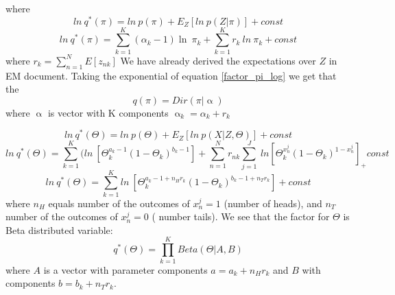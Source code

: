 \documentclass{article}
\newcommand\ProdK{\prod_{k=1}^{K}}
\newcommand\SumK{\sum_{k=1}^{K}}
\newcommand\SumN{\sum_{n=1}^{N}}
\newcommand\SumJ{\sum_{j=1}^{J}}
\begin{document}
where
\begin{equation}
    ln\:q^*(\pi) = ln\:p(\pi) + E_{Z}[ln\:p(Z|\pi)] + const
\end{equation}
\begin{equation}\label{factor_pi_log}
    ln\:q^*(\pi) = \SumK{(\alpha_k-1)\ln\:\pi_k} + \SumK r_k\:ln\:\pi_k+ const
\end{equation}
where $r_{k} = \SumN E[z_{nk}]$
We have already derived the expectations over $Z$ in EM document.
Taking the exponential of equation \ref{factor_pi_log} we get that the 
\begin{equation}
    q(\pi) = Dir(\pi| \upalpha)
\end{equation}
where $\upalpha$ is vector with K components $\upalpha_k = \alpha_k+r_k$

\begin{equation}
    ln\:q^*(\Theta) = ln\:p(\Theta) + E_Z[ln\:p(X|Z,\Theta)] + const
\end{equation}
\begin{equation}
    ln\:q^*(\Theta) = \SumK (ln\:[\Theta_k^{a_k-1}(1-\Theta_k)^{b_k-1}] + \SumN r_{nk}\SumJ \:ln[\Theta_k^{x_n^j}(1-\Theta_k)^{1-x_n^j}]_ + const
\end{equation}
\begin{equation}
    ln\:q^*(\Theta) = \SumK ln\:[\Theta_k^{a_k-1+n_H{r_k}}(1-\Theta_k)^{b_k-1+n_T{r_k}}] + const
\end{equation}
where $n_H$ equals number of the outcomes of $x_n^j = 1$ (number of heads), and $n_T$ number of the outcomes of $x_n^j = 0$ ( number tails).
We see that the factor for $\Theta$ is Beta distributed variable:
\begin{equation}
    q^*(\Theta) = \ProdK Beta(\Theta|A, B)
\end{equation}
where $A$ is a vector with parameter components $a = a_{k}+n_H{r_k}$ and $B$ with components $b = b_{k}+n_T{r_k}$.
\end{document}
